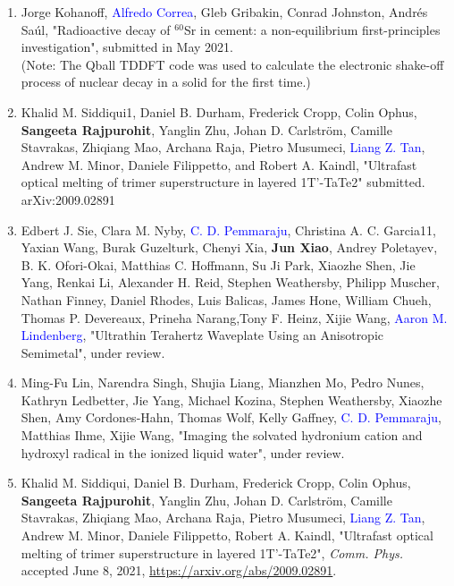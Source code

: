 \begin{enumerate}
    \item Jorge Kohanoff, \textcolor{blue}{Alfredo Correa}, Gleb Gribakin, Conrad Johnston, Andr\'{e}s Sa\'{u}l, "Radioactive decay of $^{60}$Sr in cement: a non-equilibrium first-principles investigation", submitted in May 2021.\\
    (Note: The Qball TDDFT code was used to calculate the electronic shake-off process of nuclear decay in a solid for the first time.)

    \item Khalid M. Siddiqui1, Daniel B. Durham, Frederick Cropp, Colin Ophus, {\bf Sangeeta Rajpurohit}, Yanglin Zhu, Johan D. Carlstr\"{o}m, Camille Stavrakas, Zhiqiang Mao, Archana Raja, Pietro Musumeci, \textcolor{blue}{Liang Z. Tan}, Andrew M. Minor, Daniele Filippetto, and Robert A. Kaindl, "Ultrafast optical melting of trimer superstructure in layered 1T’-TaTe2" submitted.  arXiv:2009.02891

    \item Edbert J. Sie, Clara M. Nyby, \textcolor{blue}{C. D. Pemmaraju}, Christina A. C. Garcia11, Yaxian Wang, Burak Guzelturk, Chenyi Xia, {\bf Jun Xiao}, Andrey Poletayev, B. K. Ofori-Okai, Matthias C. Hoffmann, Su Ji Park, Xiaozhe Shen, Jie Yang, Renkai Li, Alexander H. Reid, Stephen Weathersby, Philipp Muscher, Nathan Finney, Daniel Rhodes, Luis Balicas, James Hone, William Chueh, Thomas P. Devereaux, Prineha Narang,Tony F. Heinz, Xijie Wang, \textcolor{blue}{Aaron M. Lindenberg}, "Ultrathin Terahertz Waveplate Using an Anisotropic Semimetal", under review.
    
    \item Ming-Fu Lin, Narendra Singh, Shujia Liang, Mianzhen Mo, Pedro Nunes, Kathryn Ledbetter, Jie Yang, Michael Kozina, Stephen Weathersby, Xiaozhe Shen, Amy Cordones-Hahn, Thomas Wolf, Kelly Gaffney, \textcolor{blue}{C. D. Pemmaraju}, Matthias Ihme, Xijie Wang, "Imaging the solvated hydronium cation and hydroxyl radical in the ionized liquid water", under review.

    \item Khalid M. Siddiqui, Daniel B. Durham, Frederick Cropp, Colin Ophus, {\bf Sangeeta Rajpurohit}, Yanglin Zhu, Johan D. Carlström, Camille Stavrakas, Zhiqiang Mao, Archana Raja, Pietro Musumeci, \textcolor{blue}{Liang Z. Tan}, Andrew M. Minor, Daniele Filippetto, Robert A. Kaindl, "Ultrafast optical melting of trimer superstructure in layered 1T'-TaTe2", {\it Comm. Phys.} accepted June 8, 2021, \url{https://arxiv.org/abs/2009.02891}. 


\end{enumerate}
